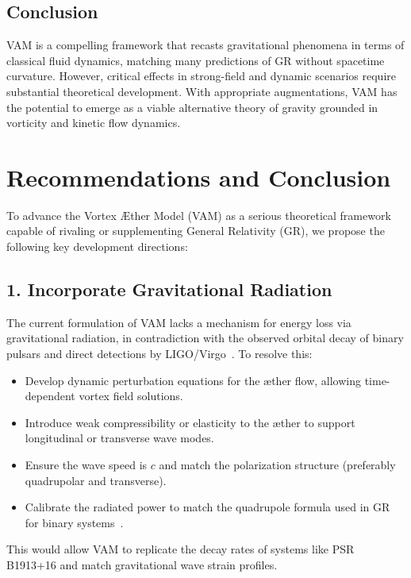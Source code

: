 \subsection*{Conclusion}

VAM is a compelling framework that recasts gravitational phenomena in terms of classical fluid dynamics, matching many predictions of GR without spacetime curvature. However, critical effects in strong-field and dynamic scenarios require substantial theoretical development. With appropriate augmentations, VAM has the potential to emerge as a viable alternative theory of gravity grounded in vorticity and kinetic flow dynamics.

\section{Recommendations and Conclusion}

To advance the Vortex Æther Model (VAM) as a serious theoretical framework capable of rivaling or supplementing General Relativity (GR), we propose the following key development directions:

\subsection*{1. Incorporate Gravitational Radiation}

The current formulation of VAM lacks a mechanism for energy loss via gravitational radiation, in contradiction with the observed orbital decay of binary pulsars and direct detections by LIGO/Virgo~\cite{abbott2016}. To resolve this:

\begin{itemize}
    \item Develop dynamic perturbation equations for the æther flow, allowing time-dependent vortex field solutions.
    \item Introduce weak compressibility or elasticity to the æther to support longitudinal or transverse wave modes.
    \item Ensure the wave speed is $c$ and match the polarization structure (preferably quadrupolar and transverse).
    \item Calibrate the radiated power to match the quadrupole formula used in GR for binary systems~\cite{weisberg2016}.
\end{itemize}

This would allow VAM to replicate the decay rates of systems like PSR B1913+16 and match gravitational wave strain profiles.

